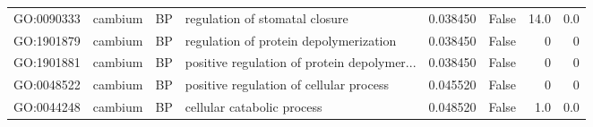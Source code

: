 \begin{longtable}{llllrlrr}
GO:0090333 & cambium & BP &   regulation of stomatal closure  & 0.038450 &   False  & 14.0 & 0.0 \\ 
GO:1901879 & cambium & BP &   regulation of protein depolymerization  & 0.038450 &   False  & 0 & 0 \\
GO:1901881 & cambium & BP &   positive regulation of protein depolymer...  & 0.038450 &   False  & 0 & 0 \\
GO:0048522 & cambium & BP &   positive regulation of cellular process  & 0.045520 &   False  & 0 & 0 \\
GO:0044248 & cambium & BP &   cellular catabolic process  & 0.048520 &   False  & 1.0 & 0.0 \\ 
\bottomrule
\end{longtable}
